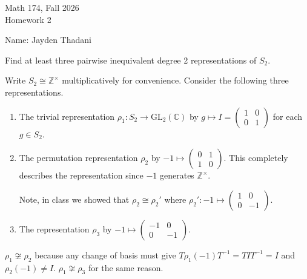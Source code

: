 \documentclass[12pt]{article}
\begin{document}
\begin{titlepage}
Math 174, Fall 2026 \\ 
Homework 2 \\

\vfill

Name: Jayden Thadani


\end{titlepage}

\begin{tcolorbox}[title=Exercise 1]
Find at least three pairwise inequivalent degree 2 representations of $S_2$. 
\end{tcolorbox}

\bigskip

Write $S_{2} \cong \mathbb{Z}^{\times}$ multiplicatively for convenience. Consider the following three representations.

\begin{enumerate}
	\item The trivial representation $\rho_{1} : S_{2} \to \mathrm{GL}_{2}(\mathbb{C})$ by $g \mapsto I = \begin{pmatrix}
			1 & 0 \\
			0 & 1
	\end{pmatrix}$ for each $g \in S_{2}$.

	\item The permutation representation $\rho_{2}$ by $-1 \mapsto \begin{pmatrix}
		0 & 1 \\
		1 & 0
	\end{pmatrix}$. This completely describes the representation since $-1$ generates $\mathbb{Z}^{\times}$. 

	Note, in class we showed that $\rho_{2} \cong \rho_{2}'$ where $\rho_{2}' : -1 \mapsto \begin{pmatrix}
		1 & 0 \\
		0 & -1
	\end{pmatrix}$.

\item The representation $\rho_{3}$ by $-1 \mapsto \begin{pmatrix}
		-1 & 0 \\
		0 & -1
\end{pmatrix}$.
\end{enumerate}

$\rho_{1} \not \cong \rho_{2}$ because any change of basis must give $T \rho_{1}(-1) T^{-1} = T I T ^{-1} = I$ and $\rho_{2}(-1) \neq I$. $\rho_{1} \not \cong \rho_{3}$ for the same reason.
\end{document}
